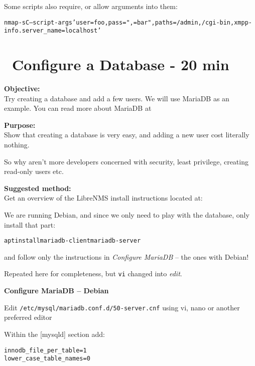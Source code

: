 \documentclass[a4paper,11pt,notitlepage]{report}
\begin{document}
Some scripts also require, or allow arguments into them:

\begin{alltt}
  nmap -sC --script-args 'user=foo,pass=",{}=bar",paths={/admin,/cgi-bin},xmpp-info.server_name=localhost'
\end{alltt}





\chapter{\faExclamationTriangle\ Configure a Database - 20 min}
\label{ex:mariadb-createdb}


{\bf Objective:}\\
Try creating a database and add a few users. We will use MariaDB as an example. You can read more about MariaDB at 


{\bf Purpose:}\\
Show that creating a database is very easy, and adding a new user cost literally nothing.

So why aren't more developers concerned with security, least privilege, creating read-only users etc.

{\bf Suggested method:}\\
Get an overview of the LibreNMS install instructions located at:\\

We are running Debian, and since we only need to play with the database, only install that part:

\begin{alltt}
apt install mariadb-client mariadb-server
\end{alltt}

and follow only the instructions in \emph{Configure MariaDB} -- the ones with Debian!

Repeated here for completeness, but \verb+vi+ changed into \emph{edit}.

{\bf Configure MariaDB -- Debian}

Edit \verb+/etc/mysql/mariadb.conf.d/50-server.cnf+ using vi, nano or another preferred editor

Within the [mysqld] section add:

\begin{alltt}
innodb_file_per_table=1
lower_case_table_names=0
\end{alltt}
\end{document}
